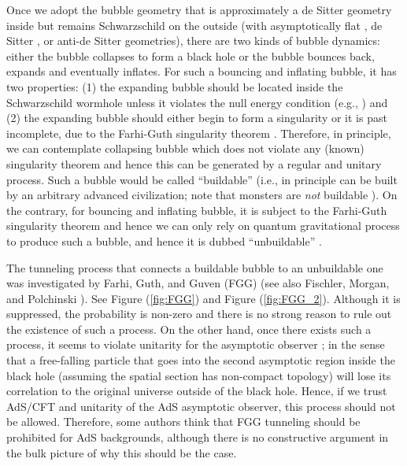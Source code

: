 \documentclass[12pt]{article}
\newcommand{\2}{$^2$}
\newcommand{\3}{$^3$}
\newcommand{\4}{$_4$}
\newcommand{\5}{$_5$}
\begin{document}
Once we adopt the bubble geometry that is approximately a de Sitter geometry inside but  remains Schwarzschild on the outside (with asymptotically flat \cite{Blau:1986cw}, de Sitter \cite{Aguirre:2005nt}, or anti-de Sitter \cite{Freivogel:2005qh} geometries), there are two kinds of bubble dynamics: either the bubble collapses to form a black hole or the bubble bounces back, expands and eventually inflates. For such a bouncing and inflating bubble, it has two properties: (1) the expanding bubble should be located inside the Schwarzschild wormhole \cite{Blau:1986cw} unless it violates the null energy condition (e.g., \cite{Lee:2010yd}) and (2) the expanding bubble should either begin to form a singularity or it is past incomplete, due to the Farhi-Guth singularity theorem \cite{Farhi:1986ty}. Therefore, in principle, we can contemplate collapsing bubble which does not violate any (known) singularity theorem and hence this can be generated by a regular and unitary process. Such a bubble would be called ``buildable'' (i.e., in principle can be built by an arbitrary advanced civilization; note that monsters are \emph{not} buildable \cite{hsu1, hsu2}). On the contrary, for bouncing and inflating bubble, it is subject to the Farhi-Guth singularity theorem and hence we can only rely on quantum gravitational process to produce such a bubble, and hence it is dubbed ``unbuildable'' \cite{Freivogel:2005qh}.

The tunneling process that connects a buildable bubble to an unbuildable one was investigated by Farhi, Guth, and Guven (FGG) \cite{Farhi:1989yr} (see also Fischler, Morgan, and Polchinski \cite{FMP1, FMP2}). See Figure (\ref{fig:FGG}) and Figure (\ref{fig:FGG_2}). Although it is suppressed, the probability is non-zero and there is no strong reason to rule out the existence of such a process. On the other hand, once there exists such a process, it seems to violate unitarity for the asymptotic observer \cite{Freivogel:2005qh}; in the sense that a free-falling particle that goes into the second asymptotic region inside the black hole (assuming the spatial section has non-compact topology) will lose its correlation to the original universe outside of the black hole. Hence, if we trust AdS/CFT and unitarity of the AdS asymptotic observer, this process should not be allowed. Therefore, some authors \cite{Freivogel:2005qh} think that FGG tunneling should be prohibited for AdS backgrounds, although there is no constructive argument in the bulk picture of why this should be the case.
\end{document}
